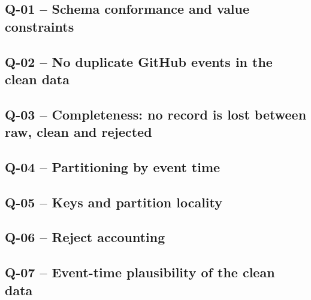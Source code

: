 \subsection*{Q-01 -- Schema conformance and value constraints}


\subsection*{Q-02 -- No duplicate GitHub events in the clean data}


\subsection*{Q-03 -- Completeness: no record is lost between raw, clean and rejected}


\subsection*{Q-04 -- Partitioning by event time}


\subsection*{Q-05 -- Keys and partition locality}


\subsection*{Q-06 -- Reject accounting}


\subsection*{Q-07 -- Event-time plausibility of the clean data}


